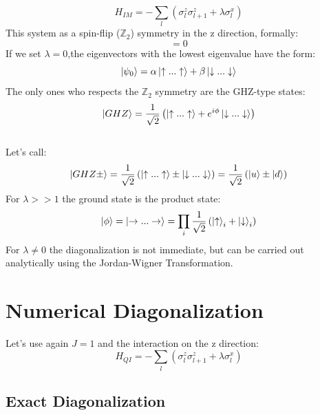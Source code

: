 \documentclass[12pt,a4paper]{article}
\begin{document}
\begin{equation}
	H_{IM}=-\sum_{l}\left(\sigma_{l}^{z} \sigma_{l+1}^{z}+\lambda\sigma_{l}^{x}\right)
\end{equation}
This system as a spin-flip ($\mathbb{Z}_2$)	symmetry in the z direction, formally:
\begin{equation}
	[H,\otimes_i \sigma^x_i]=0
\end{equation}
If we set $\lambda=0$,the eigenvectors with the lowest eigenvalue have the form:
\begin{equation}\label{eq:lambda0}
	\ket{\psi_0}=\alpha\ket{\uparrow...\uparrow} + \beta\ket{\downarrow...\downarrow}
\end{equation}
The only ones who respects the $\mathbb{Z}_2$ symmetry are the GHZ-type states:
\begin{equation}
	\ket{GHZ}=\frac{1}{\sqrt{2}}\left(\ket{\uparrow...\uparrow} +e^{i\phi} \ket{\downarrow...\downarrow} \right)
\end{equation}\\
Let's call:
\begin{equation}\label{eq:Ghz}
	\ket{GHZ\pm}=\frac{1}{\sqrt{2}}\left(\ket{\uparrow...\uparrow} \pm \ket{\downarrow...\downarrow} \right)=\frac{1}{\sqrt{2}}\left(\ket{u} \pm \ket{d} \right)
\end{equation}
For $\lambda>>1$ the ground state is the product state:
\begin{equation}\label{eq:phi}
	\ket{\phi}=\ket{\rightarrow...\rightarrow} = \prod_i\frac{1}{\sqrt{2}}\left(\ket{\uparrow}_i+\ket{\downarrow}_i\right)
\end{equation}
For $\lambda \ne 0$ the diagonalization is not immediate, but can be carried out analytically using the  Jordan-Wigner Transformation.



\section{Numerical Diagonalization}
Let's use again $J=1$ and the interaction on the z direction:
\begin{equation}
	H_{QI}=-\sum_{l}\left(\sigma_{l}^{z} \sigma_{l+1}^{z}+\lambda\sigma_{l}^{x}\right)	
\end{equation}


\subsection{Exact Diagonalization}
\end{document}

